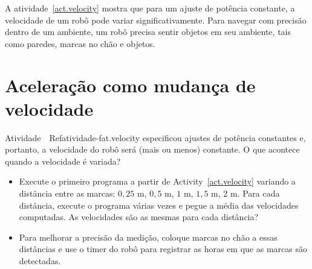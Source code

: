 A atividade~\ref{act.velocity} mostra que para um ajuste de potência constante, a velocidade de um robô pode variar significativamente. Para navegar com precisão dentro de um ambiente, um robô precisa sentir objetos em seu ambiente, tais como paredes, marcas no chão e objetos.

\section{Aceleração como mudança de velocidade}\label{s.acceleration}

Atividade~\ Ref{atividade-fat.velocity} especificou ajustes de potência constantes e, portanto, a velocidade do robô será (mais ou menos) constante. O que acontece quando a velocidade é variada?

\begin{framed}
\begin{itemize}
\item Execute o primeiro programa a partir de Activity~\ref{act.velocity} variando a distância entre as marcas: $0,25$ m, $0,5$ m, $1$ m, $1,5$ m, $2$ m. Para cada distância, execute o programa várias vezes e pegue a média das velocidades computadas. As velocidades são as mesmas para cada distância?
\item Para melhorar a precisão da medição, coloque marcas no chão a essas distâncias e use o timer do robô para registrar as horas em que as marcas são detectadas.
\end{itemize}
\end{framed}

